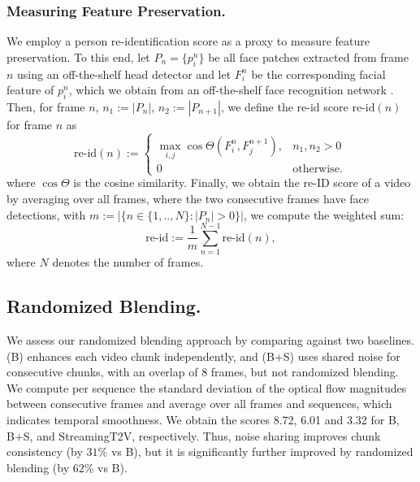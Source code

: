 \subsubsection{Measuring Feature Preservation.}
\label{sec:appendix.apm.feature_preservation_score}
We employ a person re-identification score as a proxy to measure feature preservation. To this end, let $P_n=\{p_{i}^{n}\}$ be all face patches extracted from frame $n$ using an off-the-shelf head detector  \cite{schroff2015facenet} and let $F_{i}^{n}$ be the  corresponding facial feature of $p_{i}^{n}$, which we obtain from an off-the-shelf face recognition network  \cite{schroff2015facenet}. Then, for frame $n$,  $n_{1} := |P_{n}|$, $n_{2} := |P_{n+1}|$, we define the re-id score $\text{re-id}(n)$
for frame $n$ as 
\begin{equation}
    \text{re-id}(n):=
    \begin{cases}
        \max_{i,j} \cos \Theta(F_{i}^{n},F_{j}^{n+1}), & n_{1}, n_{2} > 0\ \\ 0 & \text{otherwise.}
    \end{cases}
\end{equation}
where $\cos \Theta$ is the cosine similarity. Finally, we obtain the re-ID score of a video by averaging over all frames, where the two consecutive frames have face detections, \ie with $m := | \{n \in \{1,..,N\} : |P_{n}|>0 \}|$, we compute the weighted sum:
\begin{equation}
    \text{re-id}:=  \frac{1}{m} \sum_{n=1}^{N-1} \text{re-id}(n),
\end{equation}
where $N$ denotes the number of frames.


\subsection{Randomized Blending.}
\label{sec:appendix.ablation_studies.randomized_blending}



We assess our randomized blending approach by comparing against two baselines.
(B) enhances each video chunk independently, and (B+S) uses shared noise for consecutive chunks, with an overlap of 8 frames, but not randomized blending.
We compute per sequence the standard deviation of the optical flow magnitudes between consecutive frames and average over all frames and sequences, which indicates temporal  smoothness. We obtain the scores 8.72, 6.01 and 3.32 for B, B+S, and StreamingT2V, respectively.
Thus, noise sharing improves chunk consistency (by $31\%$ vs B), but it is significantly further improved by randomized blending (by $62\%$ vs B). 
%

